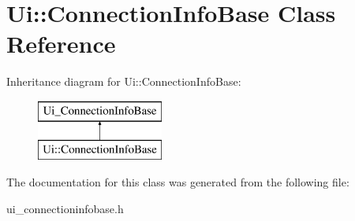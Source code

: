 \hypertarget{classUi_1_1ConnectionInfoBase}{
\section{Ui::ConnectionInfoBase Class Reference}
\label{classUi_1_1ConnectionInfoBase}
}
Inheritance diagram for Ui::ConnectionInfoBase:\begin{figure}[H]
\begin{center}
\leavevmode
\includegraphics[height=2.000000cm]{classUi_1_1ConnectionInfoBase}
\end{center}
\end{figure}


The documentation for this class was generated from the following file:\begin{DoxyCompactItemize}
\item 
ui\_\-connectioninfobase.h\end{DoxyCompactItemize}

